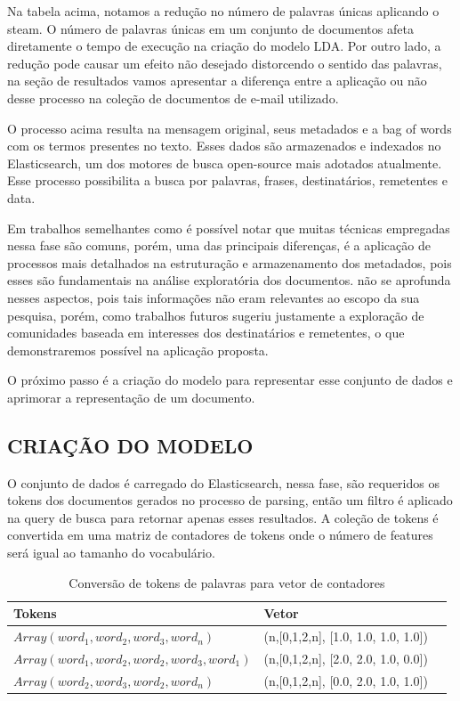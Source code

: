 \documentclass[12pt,a4paper]{article}
\begin{document}
\begin{enumerate}
Na tabela acima, notamos a redução no número de palavras únicas aplicando o steam. O número de palavras únicas em um conjunto de documentos afeta diretamente o tempo de execução na criação do modelo LDA.
 Por outro lado, a redução pode causar um efeito não desejado distorcendo o sentido das palavras,
 na seção de resultados vamos apresentar a diferença entre a aplicação ou não desse processo na coleção de documentos de e-mail utilizado.
\end{enumerate}


O processo acima resulta na mensagem original, seus metadados e a bag of words com os termos presentes no texto. Esses dados são armazenados e indexados no Elasticsearch,
 um dos motores de busca open-source mais adotados atualmente. Esse processo possibilita a busca por palavras, frases, destinatários, remetentes e data. 

Em trabalhos semelhantes como  é possível notar que muitas técnicas empregadas nessa fase são comuns, porém, uma das principais diferenças,
 é a aplicação de processos mais detalhados na estruturação e armazenamento dos metadados, pois esses são fundamentais na análise exploratória dos documentos.
  não se aprofunda nesses aspectos, pois tais informações não eram relevantes ao escopo da sua pesquisa,
 porém, como trabalhos futuros sugeriu justamente a exploração de comunidades baseada em interesses dos destinatários e remetentes, o que demonstraremos possível na aplicação proposta.

O próximo passo é a criação do modelo para representar esse conjunto de dados e aprimorar a representação de um documento.



\subsection{CRIAÇÃO DO MODELO}
O conjunto de dados é carregado do Elasticsearch, nessa fase, são requeridos os tokens dos documentos gerados no processo de parsing, então
 um filtro é aplicado na query de busca para retornar apenas esses resultados. A coleção de tokens é convertida em uma matriz de contadores de tokens onde o número de features será igual ao tamanho do vocabulário.


\begin{table}[h]
  \centering
  \begin{tabular}{l l l}
  Tokens		&Vetor &\\
  \hline
  $Array(word_1, word_2, word_3, word_n)$						&(n,[0,1,2,n], [1.0, 1.0, 1.0, 1.0]) &\\
  $Array(word_1, word_2, word_2, word_3, word_1)$				&(n,[0,1,2,n], [2.0, 2.0, 1.0, 0.0]) &\\
  $Array(word_2, word_3, word_2, word_n)$						&(n,[0,1,2,n], [0.0, 2.0, 1.0, 1.0]) &\\
  \hline
  \end{tabular}
  \caption{Conversão de tokens de palavras para vetor de contadores}
\end{table}
\end{document}
